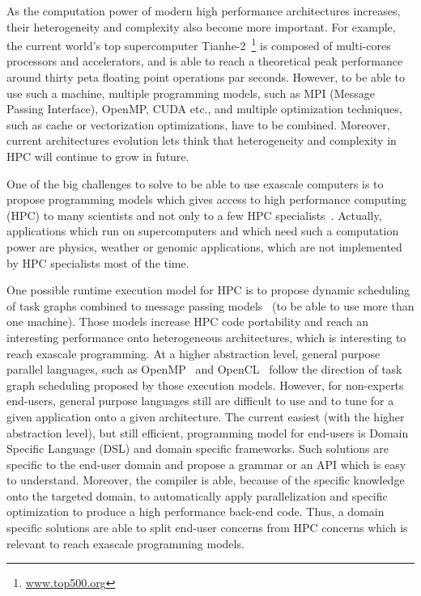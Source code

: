 
As the computation power of modern high performance architectures increases, their heterogeneity and complexity also become more important. For example, the current world's top supercomputer Tianhe-2~\footnote{\url{www.top500.org}} is composed of multi-cores processors and accelerators, and is able to reach a theoretical peak performance around thirty peta floating point operations par seconds. However, to be able to use such a machine, multiple programming models, such as MPI (Message Passing Interface), OpenMP, CUDA etc., and multiple optimization techniques, such as cache or vectorization optimizations, have to be combined. Moreover, current architectures evolution lets think that heterogeneity and complexity in HPC will continue to grow in future.

One of the big challenges to solve to be able to use exascale computers is to propose programming models which gives access to high performance computing (HPC) to many scientists and not only to a few HPC specialists~\cite{ETP4HPC2013}. Actually, applications which run on supercomputers and which need such a computation power are physics, weather or genomic applications, which are not implemented by HPC specialists most of the time.

One possible runtime execution model for HPC is to propose dynamic scheduling of task graphs combined to message passing models~\cite{Gautier:2013:XRS:2510661.2511383,Augonnet2011,wu:hal-01078359} (to be able to use more than one machine). Those models increase HPC code portability and reach an interesting performance onto heterogeneous architectures, which is interesting to reach exascale programming. At a higher abstraction level, general purpose parallel languages, such as OpenMP~\cite{660313} and OpenCL~\cite{Stone:2010:OPP:622179.1803953} follow the direction of task graph scheduling proposed by those execution models. However, for non-experts end-users, general purpose languages still are difficult to use and to tune for a given application onto a given architecture. The current easiest (with the higher abstraction level), but still efficient, programming model for end-users is Domain Specific Language (DSL) and domain specific frameworks. Such solutions are specific to the end-user domain and propose a grammar or an API which is easy to understand. Moreover, the compiler is able, because of the specific knowledge onto the targeted domain, to automatically apply parallelization and specific optimization to produce a high performance back-end code. Thus, a domain specific solutions are able to split end-user concerns from HPC concerns which is relevant to reach exascale programming models.


